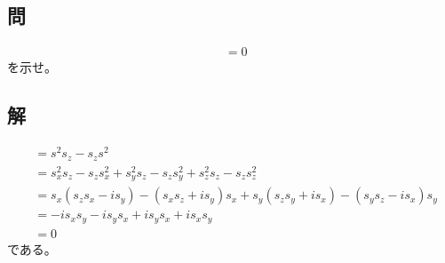 \subsection{問}
\begin{align}
	[s^2, s_z]
&=
	0
\end{align}
を示せ。

\subsection{解}
\begin{align}
	[s^2 ,s_z]
&=
	s^2 s_z
	-
	s_z s^2 \\
%
%
&=
	s_x^2 s_z
	-
	s_z s_x^2
	+
	s_y^2 s_z
	-
	s_z s_y^2
	+
	s_z^2 s_z
	-
	s_z s_z^2 \\
%
%
&=
	s_x
	(
		s_z s_x
		-
		i s_y
	)
	-
	(
		s_x s_z
		+
		i s_y
	)
	s_x
	+
	s_y
	(
		s_z s_y
		+
		i s_x
	)
	-
	(
		s_y s_z
		-
		i s_x
	)
	s_y \\
%
%
&=
	-
	i s_x s_y
	-
	i s_y s_x
	+
	i s_y s_x
	+
	i s_x s_y \\
%
%
&=
	0
\end{align}
である。
